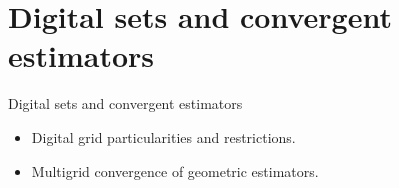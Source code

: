 \section{Digital sets and convergent estimators}

\begin{frame}
\huge
\center
Digital sets and convergent estimators
\vspace{2em}

\begin{minipage}{0.7\textwidth}
\normalsize
\center
\begin{itemize}
\item{Digital grid particularities and restrictions.}
\item{Multigrid convergence of geometric estimators.}
\end{itemize}
\end{minipage}

\end{frame}

